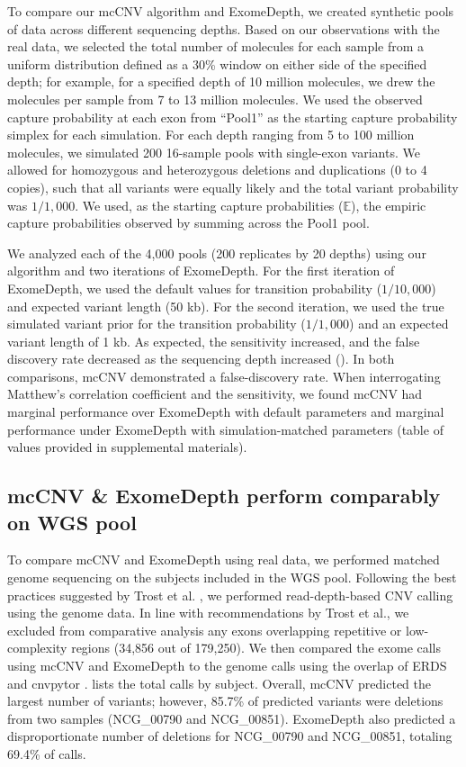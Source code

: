 \documentclass{bmcart}\usepackage[]{graphicx}\usepackage[]{color}
\begin{document}
To compare our mcCNV algorithm and ExomeDepth, we created synthetic pools of data across different sequencing depths.
Based on our observations with the real data, we selected the total number of molecules for each sample from a uniform distribution defined as a 30\% window on either side of the specified depth; for example, for a specified depth of 10 million molecules, we drew the molecules per sample from 7 to 13 million molecules.
We used the observed capture probability at each exon from ``Pool1'' as the starting capture probability simplex for each simulation.
For each depth ranging from 5 to 100 million molecules, we simulated 200 16-sample pools with single-exon variants.
We allowed for homozygous and heterozygous deletions and duplications (0 to 4 copies), such that all variants were equally likely and the total variant probability was $1/1,000$.
We used, as the starting capture probabilities ($\mathbb{E}$), the empiric capture probabilities observed by summing across the Pool1 pool.

We analyzed each of the 4,000 pools (200 replicates by 20 depths) using our algorithm and two iterations of ExomeDepth.
For the first iteration of ExomeDepth, we used the default values for transition probability ($1/10,000$) and expected variant length (50 kb).
For the second iteration, we used the true simulated variant prior for the transition probability ($1/1,000$) and an expected variant length of 1 kb.
As expected, the sensitivity increased, and the false discovery rate decreased as the sequencing depth increased ().
In both comparisons, mcCNV demonstrated a  false-discovery rate.
When interrogating Matthew's correlation coefficient \cite{matthews:1975aa} and the sensitivity, we found mcCNV had marginal performance over ExomeDepth with default parameters and marginal performance under ExomeDepth with simulation-matched parameters (table of values provided in supplemental materials).

\subsection{mcCNV \& ExomeDepth perform comparably on WGS pool}

To compare mcCNV and ExomeDepth using real data, we performed matched genome sequencing on the subjects included in the WGS pool.
Following the best practices suggested by Trost et al. \cite{trost:2018aa}, we performed read-depth-based CNV calling using the genome data.
In line with recommendations by Trost et al., we excluded from comparative  analysis any exons overlapping repetitive or low-complexity regions (34,856 out of 179,250).
We then compared the exome calls using mcCNV and ExomeDepth to the genome calls using the overlap of ERDS \cite{zhu:2012aa} and cnvpytor \cite{abyzov:2011aa}.
 lists the total calls by subject.
Overall, mcCNV predicted the largest number of variants; however, 85.7\% of predicted variants were deletions from two samples (NCG\_00790 and NCG\_00851).
ExomeDepth also predicted a disproportionate number of deletions for NCG\_00790 and NCG\_00851, totaling 69.4\% of calls.
\end{document}

